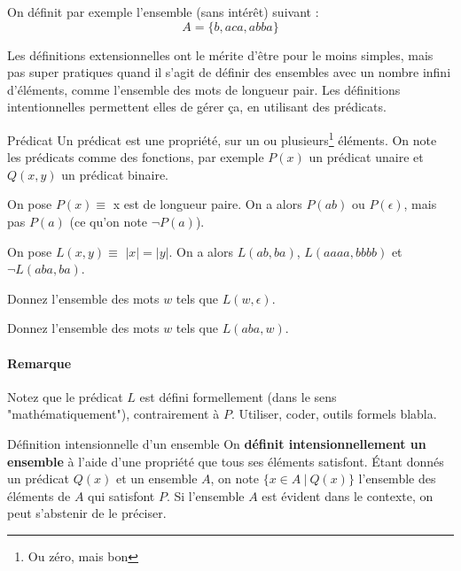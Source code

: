 \begin{example} On définit par exemple l'ensemble (sans intérêt) suivant :
\[
    A = \{b, aca, abba\}
\]
\end{example}

 Les définitions extensionnelles ont le mérite d'être pour le moins simples, mais pas super pratiques quand il s'agit de définir des ensembles avec un nombre infini d'éléments, comme l'ensemble des mots de longueur pair. Les définitions intentionnelles permettent elles de gérer ça, en utilisant des prédicats.

\begin{definition}{Prédicat}{}
Un prédicat est une propriété, sur un ou plusieurs\footnote{Ou zéro, mais bon} éléments. On note les prédicats comme des fonctions, par exemple $P(x)$ un prédicat unaire et $Q(x,y)$ un prédicat binaire.
\end{definition}

\begin{example}
On pose $P(x) \equiv$ x est de longueur paire. On a alors $P(ab)$ ou $P(\epsilon)$, mais pas $P(a)$ (ce qu'on note $\neg P(a)$). 
\end{example}

\begin{example}
\label{predL}
On pose $L(x,y) \equiv$ $|x| = |y|$. On a alors $L(ab,ba)$, $L(aaaa,bbbb)$ et $\neg L(aba,ba)$.
\end{example}

\begin{exercice}
Donnez l'ensemble des mots $w$ tels que $L(w,\epsilon)$. 
\end{exercice}

\begin{exercice}
Donnez l'ensemble des mots $w$ tels que $L(aba,w)$. 
\end{exercice}

\paragraph{Remarque} Notez que le prédicat $L$ est défini formellement (dans le sens "mathématiquement"), contrairement à $P$. Utiliser, coder, outils formels blabla.

\begin{definition}{Définition intensionnelle d'un ensemble}{}
On \textbf{définit intensionnellement un ensemble} à l'aide d'une propriété que tous ses éléments satisfont. Étant donnés un prédicat $Q(x)$ et un ensemble $A$, on note $\{x \in A~|~Q(x)\}$ l'ensemble des éléments de $A$ qui satisfont $P$. Si l'ensemble $A$ est évident dans le contexte, on peut s'abstenir de le préciser.
\end{definition}

